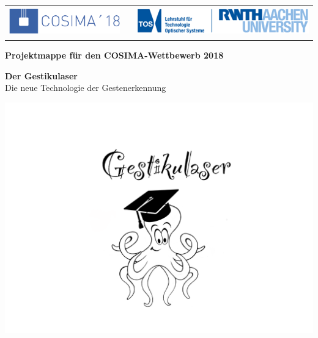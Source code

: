 
\begin{titlepage}

    
	\begin{table}[h!]
		\begin{tabular}{rp{5cm}l}
 		\includegraphics[height=1.25cm]{../Logos/Cosima18.png} & & \includegraphics[height=1.25cm]{../Logos/TOS.png} \\
		\end{tabular}
	\end{table}
    
    \small
	\parindent0pt
	
	\begin{center}
		\bfseries Projektmappe für den COSIMA-Wettbewerb 2018
	\end{center}
	
	\vspace*{15mm}
	\normalsize	
	
	\begin{center}
		\huge
		{\bfseries\sffamily Der Gestikulaser}
		\\ \vspace*{4mm}
		\large
		Die neue Technologie der Gestenerkennung
	\end{center}
	
	\vfill
	
	\begin{center}
	\large \mydate{\today}
	\end{center}
	
	\centering
	\includegraphics[scale=0.2]{../Logos/GestikulaserLogo.png}
	\vfill
	

\end{titlepage}
